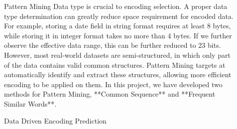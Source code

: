 \documentclass{beamer}
\newlength{\sepwid}
\newlength{\onecolwid}
\begin{document}
\begin{frame}[t]
\begin{columns}[t]
\begin{column}{\sepwid}\end{column} %

\begin{column}{\onecolwid} %

\begin{block}{Pattern Mining}
Data type is crucial to encoding selection. A proper data type determination
can greatly reduce space requirement for encoded data. For example, storing a
date field in string format requires at least 8 bytes, while storing it in
integer format takes no more than 4 bytes. If we further observe the effective
data range, this can be further reduced to 23 bits. However, most real-world
datasets are semi-structured, in which only part of the data contains valid
common structures. Pattern Mining targets at automatically identify and extract
these structures, allowing more efficient encoding to be applied on them. In
this project, we have developed two methods for Pattern Mining, **Common
Sequence** and **Frequent Similar Words**.


\end{block}

\begin{block}{Data Driven Encoding Prediction}

\end{block}

\end{column}


\begin{column}{\sepwid}\end{column} %

\end{columns}

\end{frame}
\end{document}
